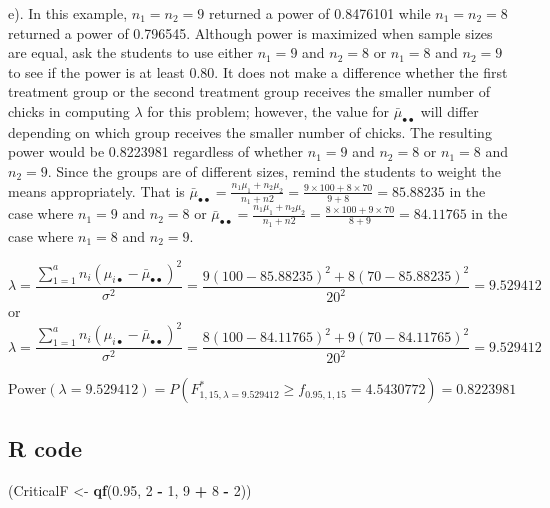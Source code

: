 \documentclass[
]{article}
\newenvironment{Shaded}{\begin{snugshade}}{\end{snugshade}}
\newcommand{\DecValTok}[1]{\textcolor[rgb]{0.00,0.00,0.81}{#1}}
\newcommand{\FloatTok}[1]{\textcolor[rgb]{0.00,0.00,0.81}{#1}}
\newcommand{\FunctionTok}[1]{\textcolor[rgb]{0.13,0.29,0.53}{\textbf{#1}}}
\newcommand{\NormalTok}[1]{#1}
\newcommand{\OtherTok}[1]{\textcolor[rgb]{0.56,0.35,0.01}{#1}}
\newcommand{\SpecialCharTok}[1]{\textcolor[rgb]{0.81,0.36,0.00}{\textbf{#1}}}
\begin{document}
e). In this example, \(n_1 = n_2 = 9\) returned a power of 0.8476101 while \(n_1 = n_2 = 8\) returned a power of 0.796545. Although power is maximized when sample sizes are equal, ask the students to use either \(n_1 = 9\) and \(n_2 = 8\) or \(n_1 = 8\) and \(n_2 = 9\) to see if the power is at least 0.80. It does not make a difference whether the first treatment group or the second treatment group receives the smaller number of chicks in computing \(\lambda\) for this problem; however, the value for \(\bar{\mu}_{\bullet\bullet}\) will differ depending on which group receives the smaller number of chicks. The resulting power would be 0.8223981 regardless of whether \(n_1 = 9\) and \(n_2 = 8\) or \(n_1 = 8\) and \(n_2 = 9\). Since the groups are of different sizes, remind the students to weight the means appropriately. That is \(\bar{\mu}_{\bullet\bullet} = \frac{n_1\mu_1+n_2\mu_2}{n_1+n2} =\frac{9\times 100 + 8 \times 70}{9 + 8}=85.88235\) in the case where \(n_1 = 9\) and \(n_2 = 8\) or \(\bar{\mu}_{\bullet\bullet} = \frac{n_1\mu_1+n_2\mu_2}{n_1+n2} =\frac{8\times 100 + 9\times 70}{8 + 9}=84.11765\) in the case where \(n_1 = 8\) and \(n_2 = 9\).

\begin{equation*}
\lambda = \frac{\sum_{1 = 1}^an_i(\mu_{i\bullet} - \bar{\mu}_{\bullet\bullet})^2}{\sigma^2} = \frac{9(100 - 85.88235)^2 + 8(70 - 85.88235)^2}{20^2} = 9.529412
\end{equation*}
or
\begin{equation*}
\lambda = \frac{\sum_{1 = 1}^an_i(\mu_{i\bullet} - \bar{\mu}_{\bullet\bullet})^2}{\sigma^2} = \frac{8(100 - 84.11765)^2 + 9(70 - 84.11765)^2}{20^2} = 9.529412
\end{equation*}

\[\text{Power}(\lambda = 9.529412) = P(F^*_{1, 15, \lambda = 9.529412} \geq f_{0.95, 1, 15} = 4.5430772) = 0.8223981\]

\hypertarget{r-code-2}{%
\subsection*{R code}\label{r-code-2}}

\begin{Shaded}
\begin{Highlighting}[]
\NormalTok{(CriticalF }\OtherTok{\textless{}{-}} \FunctionTok{qf}\NormalTok{(}\FloatTok{0.95}\NormalTok{, }\DecValTok{2} \SpecialCharTok{{-}} \DecValTok{1}\NormalTok{, }\DecValTok{9} \SpecialCharTok{+} \DecValTok{8} \SpecialCharTok{{-}} \DecValTok{2}\NormalTok{))}
\end{Highlighting}
\end{Shaded}
\end{document}
